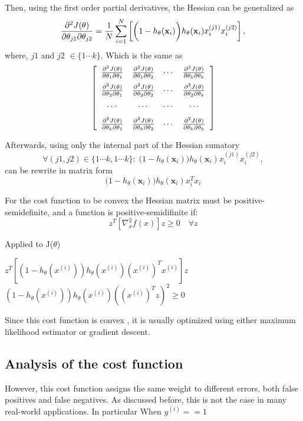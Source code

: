 Then, using the first order partial derivatives, the Hessian can be generalized as
\begin{equation}
  \frac{\partial^2 J(\theta)}{\partial\theta_{j1}\partial\theta_{j2}}=\frac{1}{N}\sum_{i=1}^{N}
  \left[\bigg(1-h_\theta(\mathbf{x}_i)\bigg)h_\theta(\mathbf{x}_i)x_i^{(j1)}x_i^{(j2)}\right],
\end{equation}
where, $j1$ and $j2$ $\in \{1\cdots k\}$. Which is the same as
\begin{equation}
\left[ \begin{array}{cccc}
  \frac{\partial^2 J(\theta)}{\partial\theta_{1}\partial\theta_{1}} & \frac{\partial^2 J(\theta)}{\partial\theta_{1}\partial\theta_{2}} & \cdots & \frac{\partial^2 J(\theta)}{\partial\theta_{1}\partial\theta_{k}} \\[0.1in]  
  \frac{\partial^2 J(\theta)}{\partial\theta_{2}\partial\theta_{1}} & \frac{\partial^2 J(\theta)}{\partial\theta_{2}\partial\theta_{2}} & \cdots & \frac{\partial^2 J(\theta)}{\partial\theta_{2}\partial\theta_{k}} \\[0.1in]  
  \cdots & \cdots & \cdots & \cdots \\[0.1in]  
  \frac{\partial^2 J(\theta)}{\partial\theta_{k}\partial\theta_{1}} & \frac{\partial^2 J(\theta)}{\partial\theta_{k}\partial\theta_{2}} & \cdots & \frac{\partial^2 J(\theta)}{\partial\theta_{k}\partial\theta_{k}}  
\end{array} \right]
\end{equation}

Afterwards, using only the internal part of the Hessian sumatory
\begin{equation}
  \forall (j1,j2) \in \{1\cdots k , 1\cdots k \} 
:\; \bigg(1-h_\theta(\mathbf{x}_i)\bigg)h_\theta(\mathbf{x}_i)x_i^{(j1)}x_i^{(j2)},
\end{equation}
can be rewrite in matrix form
\begin{equation}
  \bigg(1-h_\theta(\mathbf{x}_i)\bigg)h_\theta(\mathbf{x}_i)x_i^T x_i
\end{equation}

For the cost function to be convex the Hessian matrix	must be positive-semidefinite, and
a function is positive-semidifinite if:  
\begin{equation}
  z^T\left[\nabla_x^2f(x)\right]z \ge 0 \quad  \forall z
\end{equation}

 Applied to J($\theta$)
	\begin{center}
	$z^T \left[(1-h_\theta(x^{(i)}))h_\theta(x^{(i)})(x^{(i)})^Tx^{(i)} \right]z$\\
	$(1-h_\theta(x^{(i)}))h_\theta(x^{(i)})\left(( x^{(i)})^Tz\right)^2 \ge 0 $
	\end{center}
	
  Since this cost function is convex \citep{Murphy2012}, it is usually optimized using either 
  maximum likelihood estimator or gradient descent.	
	
	\subsection{Analysis of the cost function}
	However, this cost function assigns the same 
  weight to different errors, both false positives and false negatives. As discussed before, this 
  is not the case in many real-world applications. In particular
			\quad When  $y^{(i)}==1$
			
